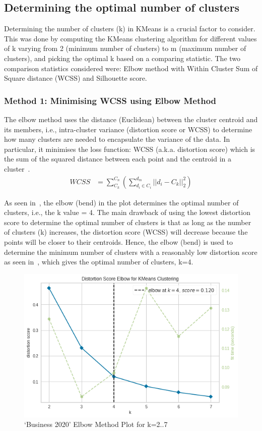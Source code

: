 \subsection*{Determining the optimal number of clusters}
Determining the number of clusters (k) in KMeans is a crucial factor to consider. This was done by computing the KMeans clustering algorithm for different values of k varying from 2 (minimum number of clusters) to m (maximum number of clusters), and picking the optimal k based on a comparing statistic. The two comparison statistics considered were: Elbow method with Within Cluster Sum of Square distance (WCSS) and Silhouette score. 

\subsubsection{Method 1: Minimising WCSS using Elbow Method}
The elbow method uses the distance (Euclidean) between the cluster centroid and its members, i.e., intra-cluster variance (distortion score or WCSS) to determine how many clusters are needed to encapsulate the variance of the data. In particular, it minimises the loss function: WCSS (a.k.a. distortion score) which is the sum of the squared distance between each point and the centroid in a cluster~\cite{elbowvssil}.
\vspace{-1ex}
\begin{align}
  \mathit{WCSS} &=  \sum^{C_n}_{C_k} (\sum^{d_m}_{d_i \in C_i} || d_i - C_k ||_2^2) \label{eq:wcss}
\end{align}

As seen in~, the elbow (bend) in the plot determines the optimal number of clusters, i.e., the k value = 4. The main drawback of using the lowest distortion score to determine the optimal number of clusters is that as long as the number of clusters (k) increases, the distortion score (WCSS) will decrease because the points will be closer to their centroids. Hence, the elbow (bend) is used to determine the minimum number of clusters with a reasonably low distortion score as seen in~, which gives the optimal number of clusters, k=4.

\begin{figure}[H]
\centering
\includegraphics[scale=0.4]{images/elbow.png}
\caption{`Business 2020' Elbow Method Plot for k=2..7}
\label{fig:elbow}
\end{figure}

